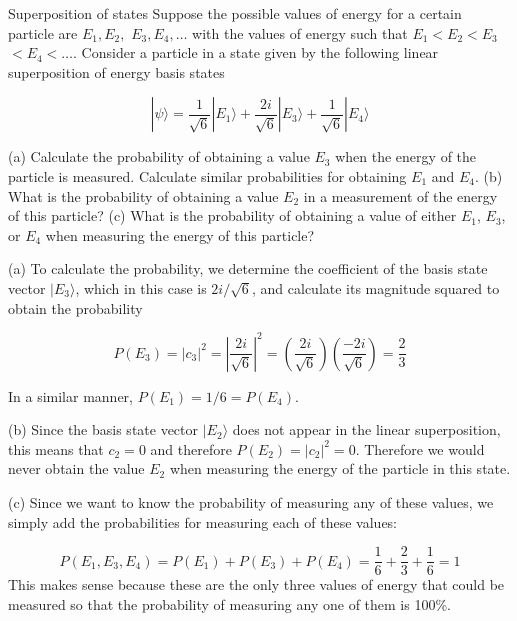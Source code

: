 \begin{example}{Superposition of states}
\label{examp:Super}
Suppose the possible values of energy for a certain particle are $E_1, E_2,$  $E_3, E_4, \ldots $ with the values of energy such that $E_1 < E_2 < E_3$ $< E_4 < \ldots $.  Consider a particle in a state given by the following linear superposition of energy basis states

\begin{equation}
|\mbox{$\psi$}\rangle = \frac{1}{\sqrt{6}} |\mbox{$E_1$}\rangle + \frac{2 i}{\sqrt{6}} |\mbox{$E_3$}\rangle + \frac{1}{\sqrt{6}} |\mbox{$E_4$}\rangle
\end{equation}

(a) Calculate the probability of obtaining a value $E_3$ when the energy of the particle is measured.  Calculate similar probabilities for obtaining $E_1$ and $E_4$.  (b) What is the probability of obtaining a value $E_2$ in a measurement of the energy of this particle?  (c) What is the probability of obtaining a value of either $E_1$, $E_3$, or $E_4$ when measuring the energy of this particle?

\solution
(a) To calculate the probability, we determine the coefficient of the basis state vector $|\mbox{$E_3$}\rangle$, which in this case is $2i/\sqrt{6}$, and calculate its magnitude squared to obtain the probability

\begin{equation} \nonumber
P(E_3) = |c_3|^2 = \left|\frac{2 i}{\sqrt{6}}\right|^2 = \left(\frac{2 i}{\sqrt{6}}\right) \left(\frac{-2 i}{\sqrt{6}} \right) = \frac{2}{3}
\end{equation}

\noindent In a similar manner, $P(E_1) = 1/6 = P(E_4)$.

(b) Since the basis state vector $|\mbox{$E_2$}\rangle$ does not appear in the linear superposition, this means that $c_2 = 0$ and therefore $P(E_2) = |c_2|^2 = 0$.  Therefore we would never obtain the value $E_2$ when measuring the energy of the particle in this state.

(c) Since we want to know the probability of measuring any of these values, we simply add the probabilities for measuring each of these values:

\begin{equation} \nonumber
P(E_1, E_3, E_4) = P(E_1) + P(E_3) + P(E_4) = \frac{1}{6} + \frac{2}{3} + \frac{1}{6} = 1
\end{equation}
This makes sense because these are the only three values of energy that could be measured so that the probability of measuring any one of them is 100\%.

\end{example}

